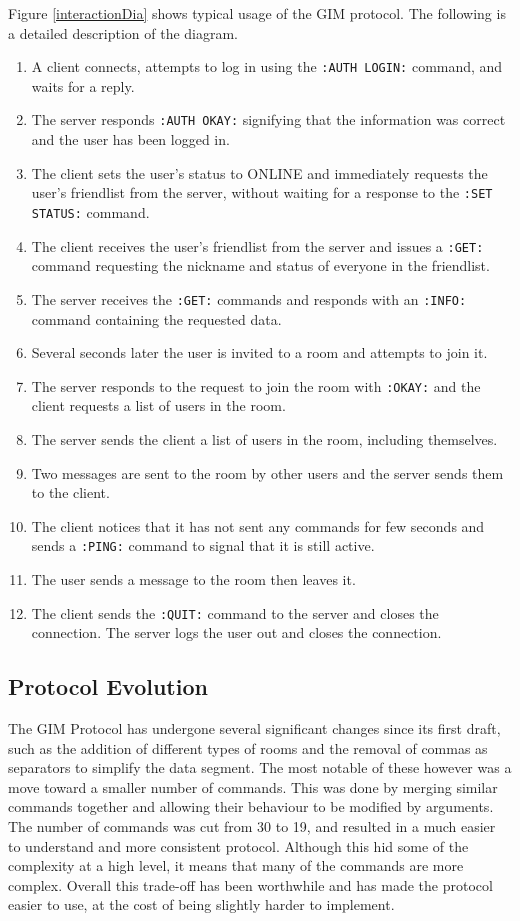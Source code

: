 Figure \ref{interactionDia} shows typical usage of the GIM protocol. The following is a detailed description of the diagram.
\begin{enumerate}
\item{A client connects, attempts to log in using the \texttt{:AUTH LOGIN:} command, and waits for a reply.}
\item{The server responds \texttt{:AUTH OKAY:} signifying that the information was correct and the user has been logged in.}
\item{The client sets the user's status to ONLINE and immediately requests the user's friendlist from the server, without waiting for a response to the \texttt{:SET STATUS:} command.}
\item{The client receives the user's friendlist from the server and issues a \texttt{:GET:} command requesting the nickname and status of everyone in the friendlist.}
\item{The server receives the \texttt{:GET:} commands and responds with an \texttt{:INFO:} command containing the requested data.}
\item{Several seconds later the user is invited to a room and attempts to join it.}
\item{The server responds to the request to join the room with \texttt{:OKAY:} and the client requests a list of users in the room.}
\item{The server sends the client a list of users in the room, including themselves.}
\item{Two messages are sent to the room by other users and the server sends them to the client.}
\item{The client notices that it has not sent any commands for few seconds and sends a \texttt{:PING:} command to signal that it is still active.}
\item{The user sends a message to the room then leaves it.}
\item{The client sends the \texttt{:QUIT:} command to the server and closes the connection. The server logs the user out and closes the connection.}
\end{enumerate}

\subsection{Protocol Evolution}
\label{protocol_evol}

The GIM Protocol has undergone several significant changes since its first draft, such as the addition of different types of rooms and the removal of commas as separators to simplify the data segment. The most notable of these however was a move toward a smaller number of commands. This was done by merging similar commands together and allowing their behaviour to be modified by arguments. The number of commands was cut from 30 to 19, and resulted in a much easier to understand and more consistent protocol. Although this hid some of the complexity at a high level, it means that many of the commands are more complex. Overall this trade-off has been worthwhile and has made the protocol easier to use, at the cost of being slightly harder to implement.

